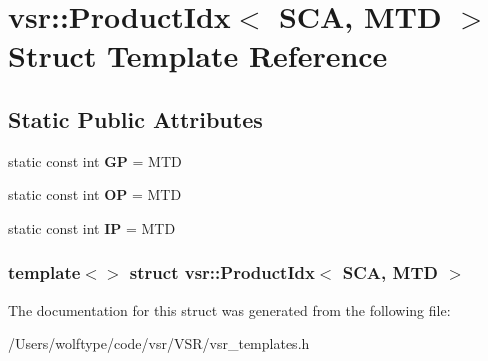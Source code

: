 \hypertarget{structvsr_1_1_product_idx_3_01_s_c_a_00_01_m_t_d_01_4}{\section{vsr\-:\-:Product\-Idx$<$ S\-C\-A, M\-T\-D $>$ Struct Template Reference}
\label{structvsr_1_1_product_idx_3_01_s_c_a_00_01_m_t_d_01_4}
}
\subsection*{Static Public Attributes}
\begin{DoxyCompactItemize}
\item 
\hypertarget{structvsr_1_1_product_idx_3_01_s_c_a_00_01_m_t_d_01_4_aa8ccaad3c80d19267c97f35269a525a8}{static const int {\bfseries G\-P} = M\-T\-D}\label{structvsr_1_1_product_idx_3_01_s_c_a_00_01_m_t_d_01_4_aa8ccaad3c80d19267c97f35269a525a8}

\item 
\hypertarget{structvsr_1_1_product_idx_3_01_s_c_a_00_01_m_t_d_01_4_a710dc8a20f515f39e83940bcd1de21d2}{static const int {\bfseries O\-P} = M\-T\-D}\label{structvsr_1_1_product_idx_3_01_s_c_a_00_01_m_t_d_01_4_a710dc8a20f515f39e83940bcd1de21d2}

\item 
\hypertarget{structvsr_1_1_product_idx_3_01_s_c_a_00_01_m_t_d_01_4_a265dd5801124272705aac08c6133e759}{static const int {\bfseries I\-P} = M\-T\-D}\label{structvsr_1_1_product_idx_3_01_s_c_a_00_01_m_t_d_01_4_a265dd5801124272705aac08c6133e759}

\end{DoxyCompactItemize}
\subsubsection*{template$<$$>$ struct vsr\-::\-Product\-Idx$<$ S\-C\-A, M\-T\-D $>$}



The documentation for this struct was generated from the following file\-:\begin{DoxyCompactItemize}
\item 
/\-Users/wolftype/code/vsr/\-V\-S\-R/vsr\-\_\-templates.\-h\end{DoxyCompactItemize}
